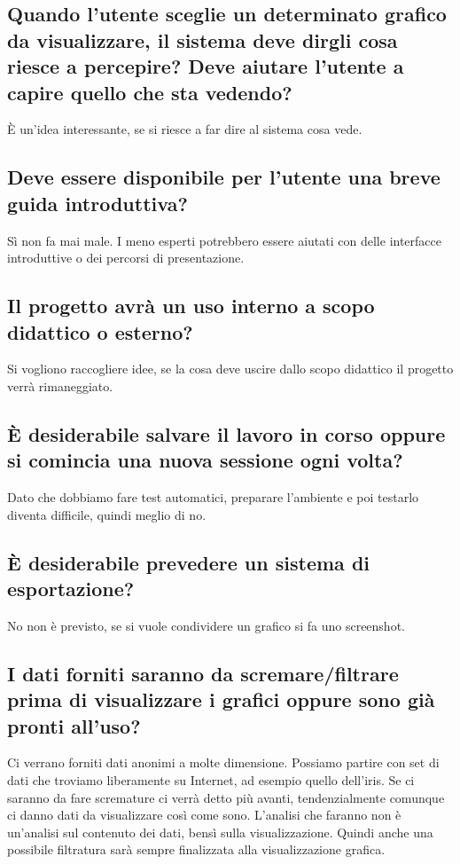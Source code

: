 \documentclass{article}
\begin{document}
    \subsection{Quando l'utente sceglie un determinato grafico da visualizzare, il sistema deve dirgli cosa riesce a percepire? Deve aiutare l'utente a capire quello che sta vedendo?}
    \label{sub:domanda_05}
    È un'idea interessante, se si riesce a far dire al sistema cosa vede.

    \subsection{Deve essere disponibile per l'utente una breve guida introduttiva?}
    \label{sub:domanda_06}
    Sì non fa mai male. I meno esperti potrebbero essere aiutati con delle interfacce introduttive o dei percorsi di presentazione.

    \subsection{Il progetto avrà un uso interno a scopo didattico o esterno?}
    \label{sub:domanda_07}
    Si vogliono raccogliere idee, se la cosa deve uscire dallo scopo didattico il progetto verrà rimaneggiato.

    \subsection{È desiderabile salvare il lavoro in corso oppure si comincia una nuova sessione ogni volta?}
    \label{sub:domanda_08}
    Dato che dobbiamo fare test automatici, preparare l'ambiente e poi testarlo diventa difficile, quindi meglio di no.
    
    \subsection{È desiderabile prevedere un sistema di esportazione?}
    \label{sub:domanda_09}
    No non è previsto, se si vuole condividere un grafico si fa uno screenshot.
    
    \subsection{I dati forniti saranno da scremare/filtrare prima di visualizzare i grafici oppure sono già pronti all'uso?}
    \label{sub:domanda_10}
    Ci verrano forniti dati anonimi a molte dimensione. Possiamo partire con set di dati che troviamo liberamente su Internet, ad esempio quello dell'iris. Se ci saranno da fare scremature ci verrà detto più avanti, tendenzialmente comunque ci danno dati da visualizzare così come sono. L'analisi che faranno non è un'analisi sul contenuto dei dati, bensì sulla visualizzazione. Quindi anche una possibile filtratura sarà sempre finalizzata alla visualizzazione grafica.
\end{document}
